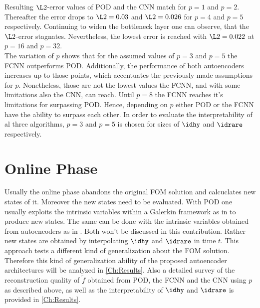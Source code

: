 Resulting \(\L2\)-error values of POD and the CNN match for \(p=1\) and \(p=2\). Thereafter the error drops to \(\L2=0.03\) and \(\L2=0.026\) for \(p=4\) and \(p=5\) respectively. Continuing to widen the bottleneck layer one can observe, that the \(\L2\)-error stagnates. Nevertheless, the lowest error is reached with \(\L2=0.022\) at \(p=16\) and \(p=32\).\\
The variation of \(p\) shows that for the assumed values of \(p=3\) and \(p=5\) the FCNN outperforms POD. Additionally, the performance of both autoencoders increases up to those points, which accentuates the previously made assumptions for \(p\). Nonetheless, those are not the lowest values the FCNN, and with some limitations also the CNN, can reach. Until \(p=8\) the FCNN reaches it's limitations for surpassing POD. Hence, depending on \(p\) either POD or the FCNN have the ability to surpass each other. In order to evaluate the interpretability of al three algorithms, \(p=3\) and \(p=5\) is chosen for sizes of \(\idhy\) and \(\idrare\) respectively.
\section{Online Phase}
Usually the online phase abandons the original FOM solution and calcuclates new states of it. Moreover the new states need to be evaluated. With POD one usually exploits the intrinsic variables within a Galerkin framework as in \cite{Bernard} to produce new states. The same can be done with the intrinsic variables obtained from autoencoders as in \cite{Carlberg}. Both won't be discussed in this contribution. Rather new states are obtained by interpolating \(\idhy\) and \(\idrare\) in time \(t\). This approach tests a different kind of generalization about the FOM solution. Therefore this kind of generalization ability of the proposed autoencoder architectures will be analyzed in \cref{Ch:Results}. Also a detailed survey of the reconstruction quality of \(\tilde{f}\) obtained from POD, the FCNN and the CNN  using \(p\) as described above, as well as the interpretability of \(\idhy\) and \(\idrare\) is provided in \cref{Ch:Results}.  